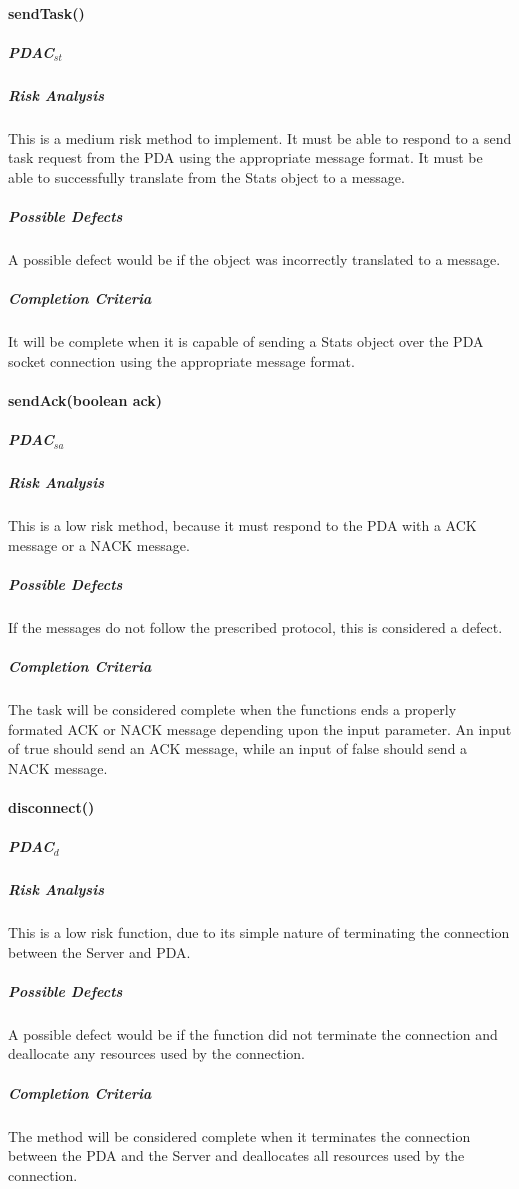 \documentclass{article}
\begin{document}
\paragraph{sendTask()}
\subparagraph{PDAC$_{st}$}

\subparagraph{Risk Analysis}
This is a medium risk method to implement. It must be able to respond to a send task request from the PDA using the appropriate message format. It must be able to successfully translate from the Stats object to a message.

\subparagraph{Possible Defects}
A possible defect would be if the object was incorrectly translated to a message.

\subparagraph{Completion Criteria}
It will be complete when it is capable of sending a Stats object over the PDA socket connection using the appropriate message format.


\paragraph{sendAck(boolean ack)}

\subparagraph{PDAC$_{sa}$}

\subparagraph{Risk Analysis}
This is a low risk method, because it must respond to the PDA with a ACK message or a NACK message.

\subparagraph{Possible Defects}
If the messages do not follow the prescribed protocol, this is considered a defect.

\subparagraph{Completion Criteria}
The task will be considered complete when the functions ends a properly formated ACK or NACK message depending upon the input parameter. An input of true should send an ACK message, while an input of false should send a NACK message.

\paragraph{disconnect()}
\subparagraph{PDAC$_{d}$}

\subparagraph{Risk Analysis}
This is a low risk function, due to its simple nature of terminating the connection between the Server and PDA.

\subparagraph{Possible Defects}
A possible defect would be if the function did not terminate the connection and deallocate any resources used by the connection.

\subparagraph{Completion Criteria}
The method will be considered complete when it terminates the connection between the PDA and the Server and deallocates all resources used by the connection.
\end{document}
